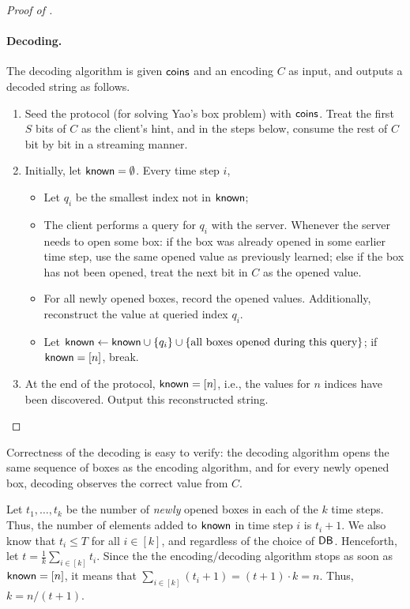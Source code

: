 \begin{proof}[Proof of ]
\paragraph{Decoding.}
The decoding algorithm is given ${\sf coins}$
and an encoding $C$ as input, and 
outputs a decoded string as follows.
\begin{enumerate}[leftmargin=6mm]
\item 
Seed the protocol (for solving Yao's box problem)
with ${\sf coins}$.  
Treat
the first $S$ bits of $C$ as the client's hint, 
and in the steps below, consume the rest of $C$ bit by bit 
in a streaming manner.
\item 
Initially, let ${\sf known}= \emptyset$.
Every time step $i$, 
\begin{itemize}[leftmargin=5mm] 
\item Let $q_i$ be the smallest
index not in ${\sf known}$; 
\item 
The client performs a query for $q_i$ with the server.
Whenever the 
server needs to open some box: if the box was already
opened in some earlier time step, use the same opened value 
as previously learned;  
else if the box has not been opened, 
treat the next bit in $C$ 
as the opened value.
\item 
For all newly opened 
boxes, record the opened values. 
Additionally, reconstruct the value at queried index $q_i$.
\item 
Let ${\sf known} \leftarrow {\sf known} 
\cup \{q_i\} \cup \{\text{all boxes opened during this query}\}$; 
if ${\sf known} = [n]$, break. 
\end{itemize}
\item 
At the end of the protocol, ${\sf known} = [n]$, i.e., 
the values for 
$n$ indices
have been discovered. 
Output this reconstructed string.
\end{enumerate}
\end{proof}
Correctness of the  
decoding is easy to verify: 
the decoding algorithm opens the same sequence
of boxes as the encoding algorithm, and for
every newly opened box, decoding observes the correct
value from $C$.



Let $t_1, \ldots, t_k$ be the 
number of {\it newly} opened boxes
in each of the $k$ time steps.
Thus, the number of elements added to ${\sf known}$ in time step
$i$
is $t_i + 1$.
We also know that $t_i \leq T$ for all $i \in [k]$, and regardless
of the choice of ${\sf DB}$.
Henceforth, let $t = \frac{1}{k}\sum_{i \in [k]} t_i$.
Since the the encoding/decoding algorithm 
stops as soon as ${\sf known} = [n]$, 
it means that $\sum_{i\in [k]}(t_i+1) = (t + 1)\cdot k = n$.
Thus, $k = n/(t+1)$.

